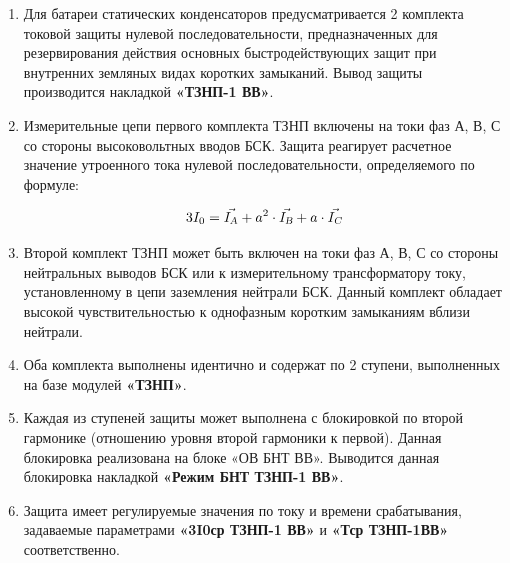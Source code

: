 \color{black}

\begin{enumerate}[label=\arabic{section}.\arabic{subsection}.\arabic{enumi}, labelsep=4pt, leftmargin=0pt, itemindent=57pt, itemsep=0pt, parsep=0pt] %


\item
Для батареи статических конденсаторов предусматривается 2 комплекта токовой защиты нулевой 
последовательности, предназначенных для резервирования действия основных быстродействующих 
защит при внутренних земляных видах коротких замыканий. Вывод защиты производится накладкой 
\textbf{«ТЗНП-1 ВВ»}.

\item
Измерительные цепи первого комплекта ТЗНП включены на токи фаз А, В, С со стороны 
высоковольтных вводов БСК. Защита реагирует расчетное значение утроенного тока нулевой 
последовательности, определяемого по формуле:

\begin{equation}
\label{eq:3I0}
3I_{0} = \vec{I_{\textsl{A}}} + a^2 \cdot \vec{I_{\textsl{B}}} + a \cdot \vec{I_{\textsl{C}}}
\end{equation}

\item
Второй комплект ТЗНП может быть включен на токи фаз А, В, С со стороны нейтральных выводов 
БСК или к измерительному трансформатору току, установленному в цепи заземления нейтрали БСК. 
Данный комплект обладает высокой чувствительностью к однофазным коротким замыканиям вблизи 
нейтрали. 

\item
Оба комплекта выполнены идентично и содержат по 2 ступени, выполненных на базе модулей 
\textbf{«ТЗНП»}.  

\item
Каждая из ступеней защиты может выполнена с блокировкой по второй гармонике (отношению 
уровня второй гармоники к первой). Данная блокировка реализована на блоке  «ОВ БНТ ВВ». Выводится 
данная блокировка накладкой \textbf{«Режим БНТ ТЗНП-1 ВВ»}. 

\item
Защита имеет регулируемые значения по току и времени срабатывания, задаваемые 
параметрами \textbf{«3I0ср ТЗНП-1 ВВ»} и \textbf{«Тср ТЗНП-1ВВ»} соответственно. 


\end{enumerate}
